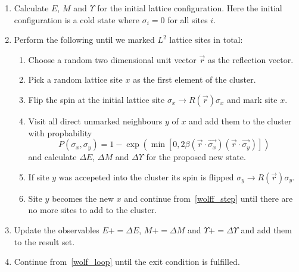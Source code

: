 		\begin{enumerate}
			\item Calculate $E$, $M$ and $\Upsilon$ for the initial lattice configuration. Here the initial configuration is a cold state where $\sigma_i = 0$ for all sites $i$.
			\item \label{wolf_loop} Perform the following until we marked $L^2$ lattice sites in total:
			\begin{enumerate}
				\item Choose a random two dimensional unit vector $\vec{r}$ as the reflection vector.
				\item Pick a random lattice site $x$ as the first element of the cluster.
				\item Flip the spin at the initial lattice site $\sigma_x \rightarrow R(\vec{r}) \sigma_x$ and mark site $x$.
				\item \label{wolff_step} Visit all direct unmarked neighbours $y$ of $x$ and add them to the cluster with propbability
					\begin{equation}
						P(\sigma_x, \sigma_y) = 1 - \exp(\min[0, 2 \beta (\vec{r}\cdot\vec{\sigma_x}) (\vec{r}\cdot\vec{\sigma_y})])
					\end{equation}
					and calculate $\Delta E$, $\Delta M$ and $\Delta \Upsilon$ for the proposed new state.
				\item If site $y$ was accepeted into the cluster its spin is flipped $\sigma_y \rightarrow R(\vec{r}) \sigma_y$.
				\item Site $y$ becomes the new $x$ and continue from~\cref{wolff_step} until there are no more sites to add to the cluster.
			\end{enumerate}
			\item Update the observables $E \mathrel{{+}{=}} \Delta E$, $M \mathrel{{+}{=}} \Delta M$ and $\Upsilon \mathrel{{+}{=}} \Delta \Upsilon$ and add them to the result set.
			\item Continue from~\cref{wolf_loop} until the exit condition is fulfilled.
		\end{enumerate}
		
		
		
	
